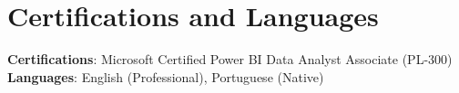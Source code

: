 \documentclass[letterpaper,11pt]{article}
\begin{document}
\section{Certifications and Languages}
 \begin{itemize}[leftmargin=0.15in, label={}]
    \small{\item{
    \textbf{Certifications}: Microsoft Certified Power BI Data Analyst Associate (PL-300) \\
    \textbf{Languages}: English (Professional), Portuguese (Native) 
    }}
 \end{itemize}
 \vspace{-16pt}
\end{document}
